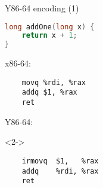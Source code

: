 \begin{frame}[fragile,label=Y86addOne1]{Y86-64 encoding (1)}
\vspace{-.5cm}
\begin{lstlisting}[language=C]
long addOne(long x) {
    return x + 1;
}
\end{lstlisting}
x86-64:
\begin{lstlisting}
    movq %rdi, %rax
    addq $1, %rax
    ret
\end{lstlisting}
Y86-64:
\begin{visibleenv}<2->
\begin{lstlisting}
    irmovq  $1,   %rax
    addq    %rdi, %rax
    ret
\end{lstlisting}
\end{visibleenv}
\end{frame}
